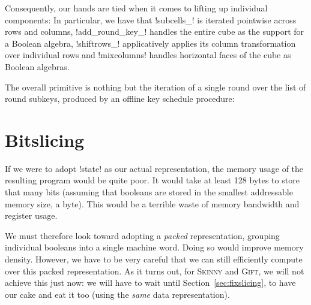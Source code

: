 \documentclass[draft,english]{jflart}
\newcommand{\Skinny}{\textsc{Skinny}}
\newcommand{\Gift}{\textsc{Gift}}
\begin{document}

Consequently, our hands are tied when it comes to lifting up
individual components:
%
%
In particular, we have that \coqe!subcells_! is iterated pointwise
across rows and columns, \coqe!add_round_key_! handles the entire cube
as the support for a Boolean algebra, \coqe!shiftrows_! applicatively
applies its column transformation over individual rows and
\coqe!mixcolumns! handles horizontal faces of the cube as Boolean
algebras.


The overall primitive is nothing but the iteration of a single round
over the list of round subkeys, produced by an offline key schedule
procedure:
%

\section{Bitslicing}
\label{sec:bitslicing}


If we were to adopt \coqe!state! as our actual representation, the
memory usage of the resulting program would be quite poor. It would take
at least 128 bytes to store that many bits (assuming that booleans are
stored in the smallest addressable memory size, a byte). This would be
a terrible waste of memory bandwidth and register usage.


We must therefore look toward adopting a \emph{packed} representation,
grouping individual booleans into a single machine word. Doing so
would improve memory density. However, we have to be very careful that
we can still efficiently compute over this packed representation. As
it turns out, for \Skinny{} and \Gift{}, we will not achieve this just
now: we will have to wait until Section~\ref{sec:fixslicing}, to have
our cake and eat it too (using the \emph{same} data representation).
\end{document}
